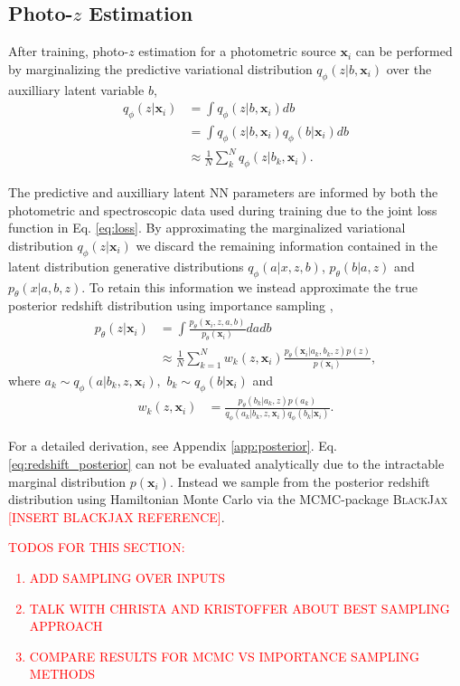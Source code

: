 \subsection{Photo-$z$ Estimation}

After training, photo-$z$ estimation for a photometric source $\mathbf{x}_i$ can be performed by marginalizing the predictive variational distribution $q_\phi(z|b,\mathbf{x}_i)$ over the auxilliary latent variable $b$,
\begin{align}
    q_\phi(z|\mathbf{x}_i) &= \int q_\phi(z|b, \mathbf{x}_i) db \\
    &= \int q_\phi(z|b,\mathbf{x}_i) q_\phi(b|\mathbf{x}_i) db \\
    &\approx \frac{1}{N} \sum_k^N q_\phi(z|b_k,\mathbf{x}_i). \label{eq:predictive_variational_dist}
\end{align}

The predictive and auxilliary latent NN parameters are informed by both the photometric and spectroscopic data used during training due to the joint loss function in Eq. \ref{eq:loss}. By approximating the marginalized variational distribution $q_\phi(z|\mathbf{x}_i)$ we discard the remaining information contained in the latent distribution generative distributions $q_\phi(a|x,z,b)$, $p_\theta(b|a,z)$ and $p_\theta(x|a,b,z)$. To retain this information we instead approximate the true posterior redshift distribution using importance sampling \citep{bishopPatternRecognitionMachine2006},
\begin{align}
    p_\theta(z|\mathbf{x}_i) &= \int \frac{p_\theta(\mathbf{x}_i, z, a, b)}{p_\theta(\mathbf{x}_i)}dadb \\
    &\approx \frac{1}{N} \sum_{k=1}^N w_k(z, \mathbf{x}_i)\frac{p_\theta(\mathbf{x}_i|a_k, b_k, z) p(z)}{p(\mathbf{x}_i)}, \label{eq:redshift_posterior}
\end{align}
where $a_k \sim q_\phi(a|b_k, z, \mathbf{x}_i),$ $ b_k \sim q_\phi(b|\mathbf{x}_i)$ and
\begin{align}
    w_k(z, \mathbf{x}_i) &= \frac{
        p_\theta(b_k| a_k, z) p(a_k) 
    }{
        q_\phi(a_k|b_k, z, \mathbf{x}_i) q_\phi(b_k|\mathbf{x}_i)
    }.
\end{align}

For a detailed derivation, see Appendix \ref{app:posterior}. Eq. \ref{eq:redshift_posterior} can not be evaluated analytically due to the intractable marginal distribution $p(\mathbf{x}_i)$. Instead we sample from the posterior redshift distribution using Hamiltonian Monte Carlo via the MCMC-package \textsc{BlackJax} \textcolor{red}{[INSERT BLACKJAX REFERENCE]}.

\textcolor{red}{
TODOS FOR THIS SECTION:
\begin{enumerate}
    \item ADD SAMPLING OVER INPUTS
    \item TALK WITH CHRISTA AND KRISTOFFER ABOUT BEST SAMPLING APPROACH
    \item COMPARE RESULTS FOR MCMC VS IMPORTANCE SAMPLING METHODS
\end{enumerate}
}